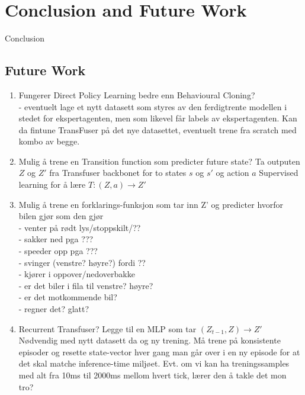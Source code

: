 \chapter{Conclusion and Future Work}
\label{chap:conclusion}

Conclusion


\section{Future Work}

\begin{enumerate}
    \item Fungerer Direct Policy Learning bedre enn Behavioural Cloning?
        \\ - eventuelt lage et nytt datasett som styres av den ferdigtrente modellen i stedet for ekspertagenten,
            men som likevel får labels av ekspertagenten. Kan da fintune TransFuser på det nye datasettet, eventuelt trene fra scratch med kombo av begge.

    \item Mulig å trene en Transition function som predicter future state?
        Ta outputen $Z$ og $Z'$ fra Transfuser backbonet for to states $s$ og $s'$ og action $a$
        Supervised learning for å lære $T: (Z, a) \rightarrow Z'$

    \item Mulig å trene en forklarings-funksjon som tar inn Z' og predicter hvorfor bilen gjør som den gjør
        \\ - venter på rødt lys/stoppskilt/??
        \\ - sakker ned pga ???
        \\ - speeder opp pga ???
        \\ - svinger (venstre? høyre?) fordi ??
        \\ - kjører i oppover/nedoverbakke
        \\ - er det biler i fila til venstre? høyre?
        \\ - er det motkommende bil?
        \\ - regner det? glatt?

    \item Recurrent Transfuser? Legge til en MLP som tar $(Z_{t-1}, Z) \rightarrow Z'$
        Nødvendig med nytt datasett da og ny trening. Må trene på konsistente episoder og resette state-vector hver gang man går over i en ny episode for at det skal matche inference-time miljøet. Evt. om vi kan ha treningssamples med alt fra 10ms til 2000ms mellom hvert tick, lærer den å takle det mon tro?


\end{enumerate}
